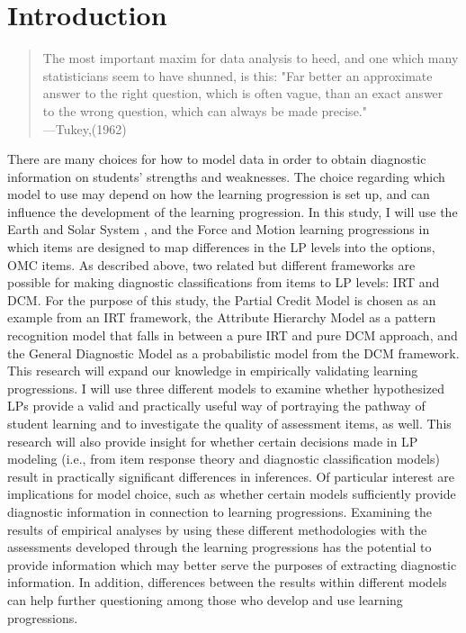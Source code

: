 \chapter{Introduction}

\begin{quote}
\begin{center}
The most important maxim for data analysis to heed, and one which many\\
statisticians seem to have shunned, is this: "Far better an approximate\\
answer to the right question, which is often vague, than an exact answer\\
to the wrong question, which can always be made precise." \\
---Tukey,(1962)
\end{center}
\end{quote}
There are many choices for how to model data in order to obtain diagnostic information on students' strengths and weaknesses. The choice regarding which model to use may depend on how the learning progression is set up, and can influence the development of the learning progression. In this study, I will use the Earth and Solar System \cite{Briggs2006}, and the Force and Motion \cite {AlonzoSteedle2009} learning progressions in which items are designed to map differences in the LP levels into the options, OMC items. 
As described above, two related but different frameworks are possible for making diagnostic classifications from items to LP levels: IRT and DCM.  For the purpose of this study, the Partial Credit Model \cite{Masters1982} is chosen as an example from an IRT framework, the Attribute Hierarchy Model \cite{GierlLeightonHunka2007} as a pattern recognition model that falls in between a pure IRT and pure DCM approach, and the General Diagnostic Model \cite{vonDavier2008} as a probabilistic model from the DCM framework. 
This research will expand our knowledge in empirically validating learning progressions. I will use three different models to examine whether hypothesized LPs provide a valid and practically useful way of portraying the pathway of student learning and to investigate the quality of assessment items, as well. This research will also provide insight for whether certain decisions made in LP modeling (i.e., from item response theory and diagnostic classification models) result in practically significant differences in inferences. Of particular interest are implications for model choice, such as whether certain models sufficiently provide diagnostic information in connection to learning progressions. Examining the results of empirical analyses by using these different methodologies with the assessments developed through the learning progressions has the potential to provide information which may better serve the purposes of extracting diagnostic information. In addition, differences between the results within different models can help further questioning among those who develop and use learning progressions. 

